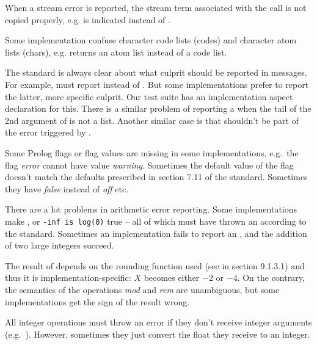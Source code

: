 \documentclass[draft]{llncs}%
\begin{document}
When a stream error is reported, the stream term associated with the call is
not copied properly, e.g.  is indicated instead of
.

Some implementation confuse character code lists (codes) and character atom
lists (chars), e.g.  returns an atom
list instead of a code list.

The standard is always clear about what culprit should be reported in
 messages. For example,
 must report
 instead of
. But some implementations
prefer to report the latter, more specific culprit. Our test suite has an
implementation aspect declaration for this. There is a similar problem of
reporting a  when the tail
of the 2nd argument of  is not a list.
Another similar case is that  shouldn't be part of the error
triggered by .

Some Prolog flags or flag values are missing in some implementations, e.g.\
the flag \textsl{error} cannot have value \textsl{warning}. Sometimes the
default value of the flag doesn't match the defaults prescribed in section
7.11 of the standard.
Sometimes they have \textsl{false} instead of \textsl{off} etc.

There are a lot problems in arithmetic error reporting. Some implementations
make \texttx{+inf is 1/0}, \texttx{nan is sqrt(-1)} or \texttt{-inf is
log(0)} true -- all of which must have thrown an
 according to the standard.
Sometimes an implementation fails to report an
, and the addition of two large
integers succeed.

The result of  depends on the rounding function
used (see in section 9.1.3.1) and thus it is implementation-specific: $X$
becomes either $-2$ or $-4$. On the contrary, the
semantics of the operations \textsl{mod} and \textsl{rem} are unambiguous, 
but some implementations get the sign of the result wrong.

All integer operations must throw an error if they don't receive integer
arguments (e.g.\ \texttx{X is 1.0>>2}). However, sometimes they just convert
the float they receive to an integer.
\end{document}
